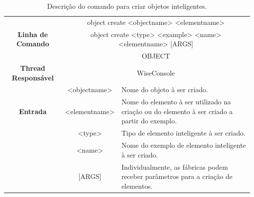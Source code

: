 \documentclass[10pt,aspectratio=169]{beamer}
\theoremstyle{remark}
\theoremstyle{definition}
\begin{document}
\begin{frame}[allowframebreaks]
		\begin{center}
			\begin{table}[!htbp]
				\begin{tabular}{|c|c|m{}|}
					\hline
					\multirow{3}{*}{\textbf{Linha de Comando}} & \multicolumn{2}{c|}{object create <object\underline{\space\space}name> <element\underline{\space\space}name>} \\
					& \multicolumn{2}{c|}{object create <type> <example> <name> <element\underline{\space\space}name> [ARGS]} \\
					\hline
					\textbf{Escopo} & \multicolumn{2}{c|}{OBJECT} \\
					\hline
					\textbf{Thread Responsável} & \multicolumn{2}{c|}{WiseConsole} \\
					\hline
					\multirow{3}{*}{\textbf{Entrada}} & <object\underline{\space\space}name> & Nome do objeto à ser criado. \\
					& <element\underline{\space\space}name> & Nome do elemento à ser utilizado na criação ou do elemento à ser criado a partir do exemplo. \\
					& <type> & Tipo de elemento inteligente à ser criado. \\
					& <name> & Nome do exemplo de elemento inteligente à ser criado. \\
					& [ARGS] & Individualmente,  as fábricas podem receber parâmetros para a criação de elementos. \\
					\hline
				\end{tabular}
				\caption{Descrição do comando para criar objetos inteligentes.}
				\label{tab:create_object}
			\end{table}
		\end{center}
		
	\end{frame}
	
	
\end{document}

